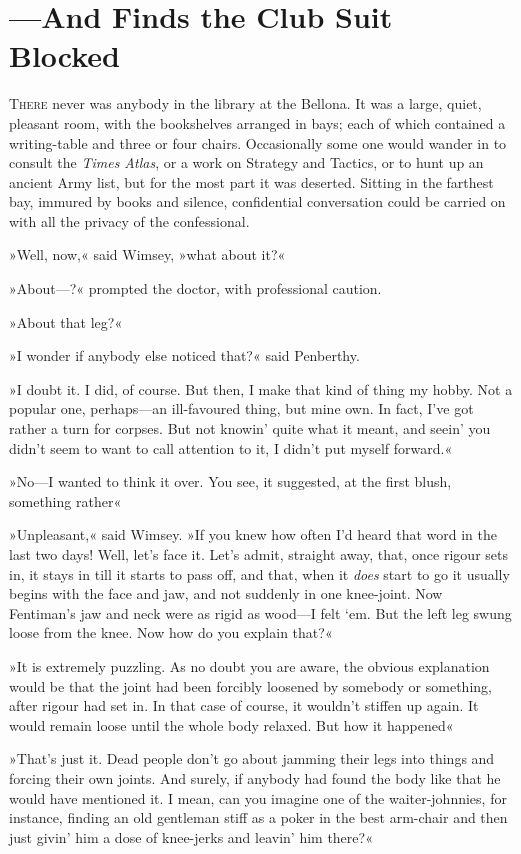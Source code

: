 \chapter{—And Finds the Club Suit Blocked}
\lettrine[lines=4]{T}{here} never was anybody in the library at the Bellona. It was a large, quiet, pleasant room, with the bookshelves arranged in bays; each of which contained a writing-table and three or four chairs. Occasionally some one would wander in to consult the \textit{Times Atlas}, or a work on Strategy and Tactics, or to hunt up an ancient Army list, but for the most part it was deserted. Sitting in the farthest bay, immured by books and silence, confidential conversation could be carried on with all the privacy of the confessional.

»Well, now,« said Wimsey, »what about it?«

»About—?« prompted the doctor, with professional caution.

»About that leg?«

»I wonder if anybody else noticed that?« said Penberthy.

»I doubt it. I did, of course. But then, I make that kind of thing my hobby. Not a popular one, perhaps—an ill-favoured thing, but mine own. In fact, I've got rather a turn for corpses. But not knowin' quite what it meant, and seein' you didn't seem to want to call attention to it, I didn't put myself forward.«

»No—I wanted to think it over. You see, it suggested, at the first blush, something rather\longdash«

»Unpleasant,« said Wimsey. »If you knew how often I'd heard that word in the last two days! Well, let's face it. Let's admit, straight away, that, once rigour sets in, it stays in till it starts to pass off, and that, when it \textit{does} start to go it usually begins with the face and jaw, and not suddenly in one knee-joint. Now Fentiman's jaw and neck were as rigid as wood—I felt `em. But the left leg swung loose from the knee. Now how do you explain that?«

»It is extremely puzzling. As no doubt you are aware, the obvious explanation would be that the joint had been forcibly loosened by somebody or something, after rigour had set in. In that case of course, it wouldn't stiffen up again. It would remain loose until the whole body relaxed. But how it happened\longdash«

»That's just it. Dead people don't go about jamming their legs into things and forcing their own joints. And surely, if anybody had found the body like that he would have mentioned it. I mean, can you imagine one of the waiter-johnnies, for instance, finding an old gentleman stiff as a poker in the best arm-chair and then just givin' him a dose of knee-jerks and leavin' him there?«

